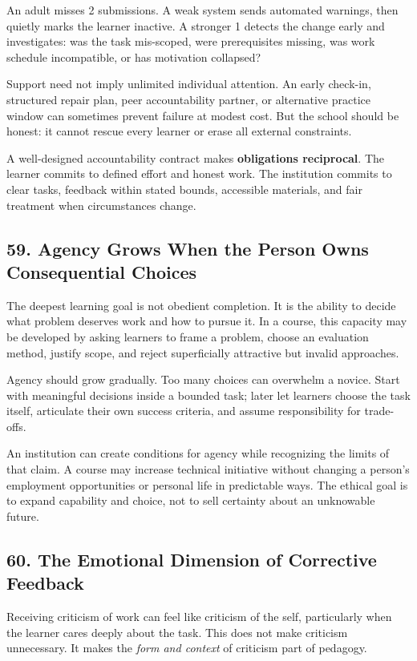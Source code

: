An adult misses 2 submissions. A weak system sends automated warnings, then quietly marks the learner inactive. A stronger 1 detects the change early and investigates: was the task mis-scoped, were prerequisites missing, was work schedule incompatible, or has motivation collapsed?

Support need not imply unlimited individual attention. An early check-in, structured repair plan, peer accountability partner, or alternative practice window can sometimes prevent failure at modest cost. But the school should be honest: it cannot rescue every learner or erase all external constraints.

A well-designed accountability contract makes \textbf{obligations reciprocal}. The learner commits to defined effort and honest work. The institution commits to clear tasks, feedback within stated bounds, accessible materials, and fair treatment when circumstances change.

\subsection*{59. Agency Grows When the Person Owns Consequential Choices}

The deepest learning goal is not obedient completion. It is the ability to decide what problem deserves work and how to pursue it. In a course, this capacity may be developed by asking learners to frame a problem, choose an evaluation method, justify scope, and reject superficially attractive but invalid approaches.

Agency should grow gradually. Too many choices can overwhelm a novice. Start with meaningful decisions inside a bounded task; later let learners choose the task itself, articulate their own success criteria, and assume responsibility for trade-offs.

An institution can create conditions for agency while recognizing the limits of that claim. A course may increase technical initiative without changing a person's employment opportunities or personal life in predictable ways. The ethical goal is to expand capability and choice, not to sell certainty about an unknowable future.

\subsection*{60. The Emotional Dimension of Corrective Feedback}

Receiving criticism of work can feel like criticism of the self, particularly when the learner cares deeply about the task. This does not make criticism unnecessary. It makes the \emph{form and context} of criticism part of pedagogy.

